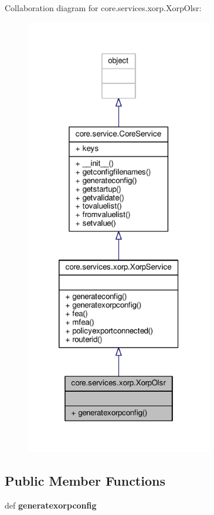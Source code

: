 Collaboration diagram for core.\+services.\+xorp.\+Xorp\+Olsr\+:
\nopagebreak
\begin{figure}[H]
\begin{center}
\leavevmode
\includegraphics[height=550pt]{classcore_1_1services_1_1xorp_1_1_xorp_olsr__coll__graph}
\end{center}
\end{figure}
\subsection*{Public Member Functions}
\begin{DoxyCompactItemize}
\item 
\hypertarget{classcore_1_1services_1_1xorp_1_1_xorp_olsr_a1d02da394ae7aa9d4e1e022a038ff304}{def {\bfseries generatexorpconfig}}\label{classcore_1_1services_1_1xorp_1_1_xorp_olsr_a1d02da394ae7aa9d4e1e022a038ff304}

\end{DoxyCompactItemize}
